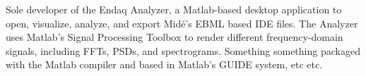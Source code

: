 \documentclass[letterpaper]{deedy-resume} %
\begin{document}
\begin{minipage}[t]{0.66\textwidth}
Sole developer of the Endaq Analyzer, a Matlab-based desktop application to open, visualize, analyze, and export Midé's EBML based IDE files.  The Analyzer uses Matlab's Signal Processing Toolbox to render different frequency-domain signals, including FFTs, PSDs, and spectrograms.  Something something packaged with the Matlab compiler and based in Matlab's GUIDE system, etc etc.

\sectionspace %


%
%
%

\end{minipage} %



\end{document}
